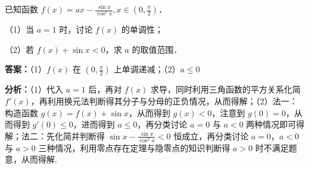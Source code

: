 \begin{question}
已知函数 $f(x)=ax-\frac{\sin x}{\cos^2 x}, x\in(0,\frac{\pi}{2})$．

（1）当 $a=1$ 时，讨论 $f(x)$ 的单调性；

（2）若 $f(x)+\sin x<0$，求 $a$ 的取值范围．
\begin{solution}
\textbf{答案：}（1）$f(x)$ 在 $(0,\frac{\pi}{2})$ 上单调递减；（2）$a\le0$

\textbf{分析：}（1）代入 $a=1$ 后，再对 $f(x)$ 求导，同时利用三角函数的平方关系化简 $f'(x)$，再利用换元法判断得其分子与分母的正负情况，从而得解；（2）法一：构造函数 $g(x)=f(x)+\sin x$，从而得到 $g(x)<0$，注意到 $g(0)=0$，从而得到 $g'(0)\le0$，进而得到 $a\le0$，再分类讨论 $a=0$ 与 $a<0$ 两种情况即可得解；法二：先化简并判断得 $\sin x-\frac{\sin x}{\cos^2 x}<0$ 恒成立，再分类讨论 $a=0$，$a<0$ 与 $a>0$ 三种情况，利用零点存在定理与隐零点的知识判断得 $a>0$ 时不满足题意，从而得解.


\end{solution}
\end{question}
